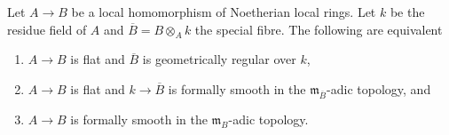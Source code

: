 \begin{proposition}
\label{proposition-fs-flat-fibre-fs}
Let $A \to B$ be a local homomorphism of Noetherian local rings.
Let $k$ be the residue field of $A$ and $\overline{B} = B \otimes_A k$
the special fibre. The following are equivalent
\begin{enumerate}
\item $A \to B$ is flat and $\overline{B}$ is geometrically regular
over $k$,
\item $A \to B$ is flat and $k \to \overline{B}$ is formally smooth
in the $\mathfrak m_{\overline{B}}$-adic topology, and
\item $A \to B$ is formally smooth in the $\mathfrak m_B$-adic
topology.
\end{enumerate}
\end{proposition}


